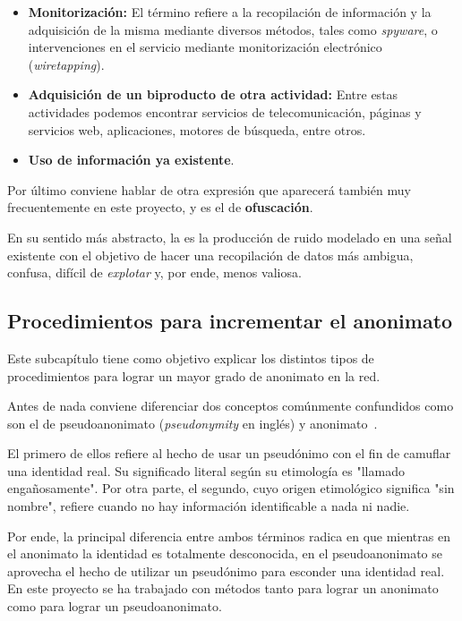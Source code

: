 \begin{itemize}
	\item {\textbf{Monitorización:} El término refiere a la recopilación de información y la adquisición de la misma mediante diversos métodos, tales como \textit{spyware}, o intervenciones en el servicio mediante monitorización electrónico (\textit{wiretapping}).}
	\item {\textbf{Adquisición de un biproducto de otra actividad:} Entre estas actividades podemos encontrar servicios de telecomunicación, páginas y servicios web, aplicaciones, motores de búsqueda, entre otros.} 
	\item {\textbf{Uso de información ya existente}.}
\end{itemize} 

Por último conviene hablar de otra expresión que aparecerá también muy
frecuentemente en este proyecto, y es el de \textbf{ofuscación}.

En su sentido más abstracto, la  es la producción de ruido modelado en una señal existente con el objetivo de hacer una recopilación de datos más ambigua, confusa, difícil de \textit{explotar} y, por ende, menos valiosa.

\subsection{Procedimientos para incrementar el anonimato}

Este subcapítulo tiene como objetivo explicar los distintos tipos de
procedimientos para lograr un mayor grado de anonimato en la red.

Antes de nada conviene diferenciar dos conceptos comúnmente
confundidos como son el de pseudoanonimato (\textit{pseudonymity} en
inglés) y anonimato~\cite{article:anopseudo}.

El primero de ellos refiere al hecho de usar un pseudónimo con el fin
de camuflar una identidad real. Su significado literal según su
etimología es "llamado engañosamente".  Por otra parte, el segundo,
cuyo origen etimológico significa "sin nombre", refiere cuando no hay
información identificable a nada ni nadie.

Por ende, la principal diferencia entre ambos términos radica en que
mientras en el anonimato la identidad es totalmente desconocida, en el
pseudoanonimato se aprovecha el hecho de utilizar un pseudónimo para
esconder una identidad real.  En este proyecto se ha trabajado con
métodos tanto para lograr un anonimato como para lograr un
pseudoanonimato. 

